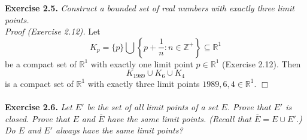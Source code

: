 \documentclass{article}
\begin{document}



\textbf{Exercise 2.5.}
\emph{Construct a bounded set of real numbers with exactly three limit points.} \\

\emph{Proof (Exercise 2.12).}
Let
$$K_{p} =
\{ p \}
\bigcup
\left\{ p + \frac{1}{n} : n \in \mathbb{Z}^+ \right\} \subseteq \mathbb{R}^1$$
be a compact set of $\mathbb{R}^1$ with exactly one limit point $p \in \mathbb{R}^1$
(Exercise 2.12).
Then
$$K_{1989} \cup K_{6} \cup K_{4}$$
is a compact set of $\mathbb{R}^1$ with exactly three limit points
$1989, 6, 4 \in \mathbb{R}^1$.
$\Box$ \\\\






\textbf{Exercise 2.6.}
\emph{Let $E'$ be the set of all limit points of a set $E$.
Prove that $E'$ is closed.
Prove that $E$ and $\overline{E}$ have the same limit points.
(Recall that $\overline{E} = E \cup E'$.)
Do $E$ and $E'$ always have the same limit points?} \\
\end{document}
